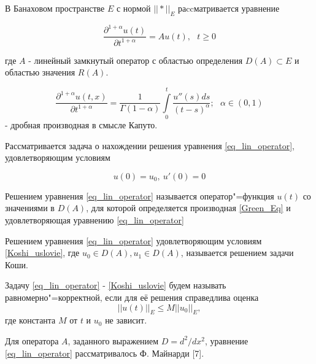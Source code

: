 
\vzmscaption


В Банаховом пространстве $E$ с нормой $||*||_E$ раccматривается уравнение

\begin{equation}\label{eq_lin_operator}
	\frac{\partial^{1+\alpha} u(t)}{\partial t^{1+\alpha}} = Au(t), \ \ \ t \geqslant 0
\end{equation}

где $A$ - линейный замкнутый оператор с областью определения $D(A) \subset E$ и областью значения $R(A)$.

\begin{equation}\label{Green_Eq}
        \frac{\partial^{1+\alpha}u(t,x)}{\partial t^{1+\alpha}} = \frac{1}{\Gamma(1-\alpha)} \int\limits_0^t \frac{u''(s)ds}{(t - s)^{\alpha}}; \ \ \ \alpha \in (0, 1)
\end{equation}
 - дробная производная в смысле Капуто.
\vspace{3mm}


Рассматривается задача о нахождении решения уравнения \ref{eq_lin_operator}, удовлетворяющим условиям

\begin{equation}\label{Koshi_uslovie}
	u(0) = u_0, \ u'(0) = 0
\end{equation}

\begin{definition}
	Решением уравнения \ref{eq_lin_operator} называется оператор"=функция $u(t)$ со значениями в $D(A)$, для которой определяется производная \ref{Green_Eq} и удовлетворяющая уравнению \ref{eq_lin_operator}
\end{definition}

\begin{definition}
	Решением уравнения \ref{eq_lin_operator} удовлетворяющим условиям \ref{Koshi_uslovie}, где $u_0 \in D(A), u_1 \in D(A)$, называется решением задачи Коши.
\end{definition}

\begin{definition}
	Задачу \ref{eq_lin_operator} - \ref{Koshi_uslovie} будем называть равномерно"=корректной, если для её решения справедлива оценка
	\begin{equation}\label{ocenka}
		||u(t)||_E \leq M||u_0||_E,
	\end{equation}
	где константа $M$ от $t$ и $u_0$ не зависит.
\end{definition}
Для оператора $A$, заданного выражением $D=d^2/dx^2$, уравнение \ref{eq_lin_operator} рассматривалось Ф. Майнарди [7].
\vspace{3mm}


